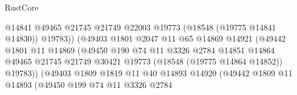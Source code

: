 \begin{lexlean}{RustCore}
\begin{coremodule}
                                            @14841
                                            @49465
                                            @21745
                                            @21749
                                            @22003
                                            @19773
                                            (@18548 (@19775 @14841 @14830))
                                            @19783))
                                        (@49403
                                          @1801
                                          @2047
                                          @11
                                          @65
                                          @14869
                                          @14921
                                          (@49442
                                            @1801
                                            @11
                                            @14869
                                            (@49450
                                              @190
                                              @74
                                              @11
                                              @3326
                                              @2784
                                              @14851
                                              @14864
                                              @49465
                                              @21745
                                              @21749
                                              @30421
                                              @19773
                                              (@18548 (@19775 @14864 @14852))
                                              @19783))
                                          (@49403
                                            @1809
                                            @1819
                                            @11
                                            @40
                                            @14893
                                            @14920
                                            (@49442
                                              @1809
                                              @11
                                              @14893
                                              (@49450
                                                @199
                                                @74
                                                @11
                                                @3326
                                                @2784

\end{coremodule}
\end{lexlean}
